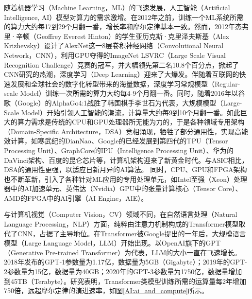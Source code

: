 随着机器学习（Machine Learning，ML）的飞速发展，人工智能（Artificial Intelligence, AI）模型对算力的需求激增。在2012年之前，训练一个ML系统所需的算力大约每17到29个月翻一番\cite{AI:computing_demand_trend}，增长率和摩尔定律基本一致。然而，2012年杰弗里·辛顿（Geoffrey Everest Hinton）的学生亚历克斯·克里泽夫斯基（Alex Krizhevsky）设计了AlexNet\cite{AI:AlexNet}这一8层卷积神经网络（Convolutional Neural Network，CNN），利用GPU夺得的ImageNet LSVRC（Large Scale Visual Recognition Challenge）竞赛的冠军，并大幅领先第二名10.8个百分点，掀起了CNN研究的热潮，深度学习（Deep Learning）迎来了大爆发。伴随着互联网的快速发展和全球社会的数字化转型带来的海量数据，深度学习常规模型（Regular-scale Model）训练一次所需的算力大约每4-9个月翻一番\cite{AI:computing_demand_trend}。同时，随着2016年以谷歌（Google）的AlphaGo\cite{AI:AlphaGo}4:1战胜了韩国棋手李世石为代表，大规模模型（Large-Scale Model）开始引领人工智能的潮流，计算量大约每9到10个月翻一番\cite{AI:computing_demand_trend}。如此巨大的算力需求是传统的CPU和GPU处理器所无能为力的，于是各种领域专用架构（Domain-Specific Architecture，DSA）竞相涌现，牺牲了部分通用性，实现高能效计算，如寒武纪的DianNao\cite{Accelerator:DianNao}、Google的已经发展到第四代的TPU（Tensor Processing Unit）\cite{Accelerator:TPU}、GraphCore的IPU（Intelligence Processing Unit）\cite{Accelerator:IPU}、华为的DaVinci架构\cite{Accelerator:DaVinci}、百度的昆仑芯片\cite{Accelerator:Kunlun}等，计算机架构迎来了新黄金时代\cite{new_golden}。与ASIC相比，DSA的通用性更强，以适应日新月异的AI算法。
同时，CPU、GPU和FPGA架构也不断革新，引入了各种针对ML应用的专用处理单元，如Intel至强（Xeon）处理器中的AI加速单元\cite{Accelerator:intel_xeon_4th}、英伟达（Nvidia）GPU中的张量计算核心（Tensor Core）\cite{Accelerator:nvdia_h100_tensor_core_4th}、AMD的FPGA中的AI引擎（AI Engine，AIE）\cite{Accelerator:amd_versal_AIE}。

与计算机视觉（Computer Vision，CV）领域不同，在自然语言处理（Natural Language Processing，NLP）方面，纯粹由注意力机制构成的Transformer模型\cite{AI:attention_is_all}取代了CNN，占据了主导地位。在Transformer被Google提出的一年后，大规模语言模型（Large Language Model，LLM）开始出现。以OpenAI旗下的GPT（Generative Pre-trained Transformer）为代表，LLM的大小一直在飞速增长。2018年发布的GPT-1参数量为1.17亿，数据量为5GB（Gigabyte）；2019年的GPT-2参数量为15亿，数据量为40GB；2020年的GPT-3参数量为1750亿，数据量增加到45TB（Terabyte）。研究表明，Transformer类模型训练所需的运算量每2年增加750倍\cite{ai_and_memory_wall}，远超摩尔定律的演进速率，如图\ref{AI:ai_and_compute}所示。

